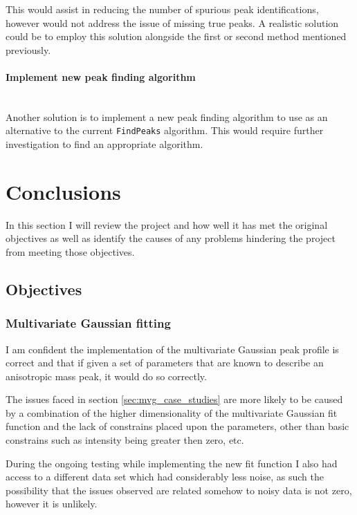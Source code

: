 \documentclass[a4paper]{article}
\begin{document}
This would assist in reducing the number of spurious peak identifications,
however would not address the issue of missing true peaks. A realistic solution
could be to employ this solution alongside the first or second method mentioned
previously.

\paragraph{Implement new peak finding algorithm} \hfill \\

Another solution is to implement a new peak finding algorithm to use as an
alternative to the current \texttt{FindPeaks} algorithm. This would require
further investigation to find an appropriate algorithm.

\section{Conclusions}
\label{sec:conclusion}

In this section I will review the project and how well it has met the original
objectives as well as identify the causes of any problems hindering the project
from meeting those objectives.

\subsection{Objectives}

\subsubsection{Multivariate Gaussian fitting}

I am confident the implementation of the multivariate Gaussian peak profile is
correct and that if given a set of parameters that are known to describe an
anisotropic mass peak, it would do so correctly.

The issues faced in section \ref{sec:mvg_case_studies} are more likely to be
caused by a combination of the higher dimensionality of the multivariate
Gaussian fit function and the lack of constrains placed upon the parameters,
other than basic constrains such as intensity being greater then zero, etc.

During the ongoing testing while implementing the new fit function I also had
access to a different data set which had considerably less noise, as such the
possibility that the issues observed are related somehow to noisy data is not
zero, however it is unlikely.
\end{document}
